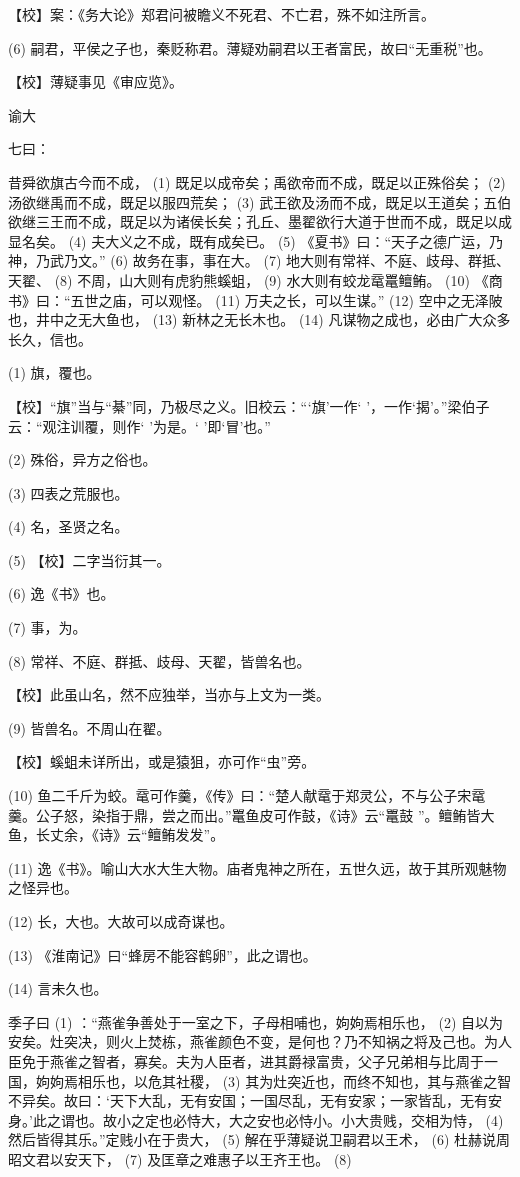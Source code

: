 \documentclass[12pt,UTF8]{ctexbook}
\begin{document}
【校】案：《务大论》郑君问被瞻义不死君、不亡君，殊不如注所言。

(6) 嗣君，平侯之子也，秦贬称君。薄疑劝嗣君以王者富民，故曰“无重税”也。

【校】薄疑事见《审应览》。





谕大


七曰：

昔舜欲旗古今而不成， (1) 既足以成帝矣；禹欲帝而不成，既足以正殊俗矣； (2) 汤欲继禹而不成，既足以服四荒矣； (3) 武王欲及汤而不成，既足以王道矣；五伯欲继三王而不成，既足以为诸侯长矣；孔丘、墨翟欲行大道于世而不成，既足以成显名矣。 (4) 夫大义之不成，既有成矣已。 (5) 《夏书》曰：“天子之德广运，乃神，乃武乃文。” (6) 故务在事，事在大。 (7) 地大则有常祥、不庭、歧母、群抵、天翟、 (8) 不周，山大则有虎豹熊螇蛆， (9) 水大则有蛟龙鼋鼍鳣鲔。 (10) 《商书》曰：“五世之庙，可以观怪。 (11) 万夫之长，可以生谋。” (12) 空中之无泽陂也，井中之无大鱼也， (13) 新林之无长木也。 (14) 凡谋物之成也，必由广大众多长久，信也。

(1) 旗，覆也。

【校】“旗”当与“綦”同，乃极尽之义。旧校云：“‘旗’一作‘ ’，一作‘揭’。”梁伯子云：“观注训覆，则作‘ ’为是。‘ ’即‘冒’也。”

(2) 殊俗，异方之俗也。

(3) 四表之荒服也。

(4) 名，圣贤之名。

(5) 【校】二字当衍其一。

(6) 逸《书》也。

(7) 事，为。

(8) 常祥、不庭、群抵、歧母、天翟，皆兽名也。

【校】此虽山名，然不应独举，当亦与上文为一类。

(9) 皆兽名。不周山在翟。

【校】螇蛆未详所出，或是猿狙，亦可作“虫”旁。

(10) 鱼二千斤为蛟。鼋可作羹，《传》曰：“楚人献鼋于郑灵公，不与公子宋鼋羹。公子怒，染指于鼎，尝之而出。”鼍鱼皮可作鼓，《诗》云“鼍鼓 ”。鳣鲔皆大鱼，长丈余，《诗》云“鳣鲔发发”。

(11) 逸《书》。喻山大水大生大物。庙者鬼神之所在，五世久远，故于其所观魅物之怪异也。

(12) 长，大也。大故可以成奇谋也。

(13) 《淮南记》曰“蜂房不能容鹤卵”，此之谓也。

(14) 言未久也。

季子曰 (1) ：“燕雀争善处于一室之下，子母相哺也，姁姁焉相乐也， (2) 自以为安矣。灶突决，则火上焚栋，燕雀颜色不变，是何也？乃不知祸之将及己也。为人臣免于燕雀之智者，寡矣。夫为人臣者，进其爵禄富贵，父子兄弟相与比周于一国，姁姁焉相乐也，以危其社稷， (3) 其为灶突近也，而终不知也，其与燕雀之智不异矣。故曰：‘天下大乱，无有安国；一国尽乱，无有安家；一家皆乱，无有安身。’此之谓也。故小之定也必恃大，大之安也必恃小。小大贵贱，交相为恃， (4) 然后皆得其乐。”定贱小在于贵大， (5) 解在乎薄疑说卫嗣君以王术， (6) 杜赫说周昭文君以安天下， (7) 及匡章之难惠子以王齐王也。 (8)
\end{document}
